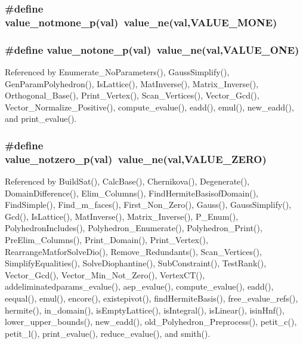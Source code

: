 \subsubsection{\setlength{\rightskip}{0pt plus 5cm}\#define value\_\-notmone\_\-p(val)\ value\_\-ne(val,VALUE\_\-MONE)}\label{arithmetique_8h_a72}


\subsubsection{\setlength{\rightskip}{0pt plus 5cm}\#define value\_\-notone\_\-p(val)\ value\_\-ne(val,VALUE\_\-ONE)}\label{arithmetique_8h_a70}




Referenced by Enumerate\_\-No\-Parameters(), Gauss\-Simplify(), Gen\-Param\-Polyhedron(), Is\-Lattice(), Mat\-Inverse(), Matrix\_\-Inverse(), Orthogonal\_\-Base(), Print\_\-Vertex(), Scan\_\-Vertices(), Vector\_\-Gcd(), Vector\_\-Normalize\_\-Positive(), compute\_\-evalue(), eadd(), emul(), new\_\-eadd(), and print\_\-evalue().

\subsubsection{\setlength{\rightskip}{0pt plus 5cm}\#define value\_\-notzero\_\-p(val)\ value\_\-ne(val,VALUE\_\-ZERO)}\label{arithmetique_8h_a68}




Referenced by Build\-Sat(), Calc\-Base(), Chernikova(), Degenerate(), Domain\-Difference(), Elim\_\-Columns(), Find\-Hermite\-Basisof\-Domain(), Find\-Simple(), Find\_\-m\_\-faces(), First\_\-Non\_\-Zero(), Gauss(), Gauss\-Simplify(), Gcd(), Is\-Lattice(), Mat\-Inverse(), Matrix\_\-Inverse(), P\_\-Enum(), Polyhedron\-Includes(), Polyhedron\_\-Enumerate(), Polyhedron\_\-Print(), Pre\-Elim\_\-Columns(), Print\_\-Domain(), Print\_\-Vertex(), Rearrange\-Matfor\-Solve\-Dio(), Remove\_\-Redundants(), Scan\_\-Vertices(), Simplify\-Equalities(), Solve\-Diophantine(), Sub\-Constraint(), Test\-Rank(), Vector\_\-Gcd(), Vector\_\-Min\_\-Not\_\-Zero(), Vertex\-CT(), addeliminatedparams\_\-evalue(), aep\_\-evalue(), compute\_\-evalue(), eadd(), eequal(), emul(), encore(), existepivot(), find\-Hermite\-Basis(), free\_\-evalue\_\-refs(), hermite(), in\_\-domain(), is\-Empty\-Lattice(), is\-Integral(), is\-Linear(), isin\-Hnf(), lower\_\-upper\_\-bounds(), new\_\-eadd(), old\_\-Polyhedron\_\-Preprocess(), petit\_\-c(), petit\_\-l(), print\_\-evalue(), reduce\_\-evalue(), and smith().

